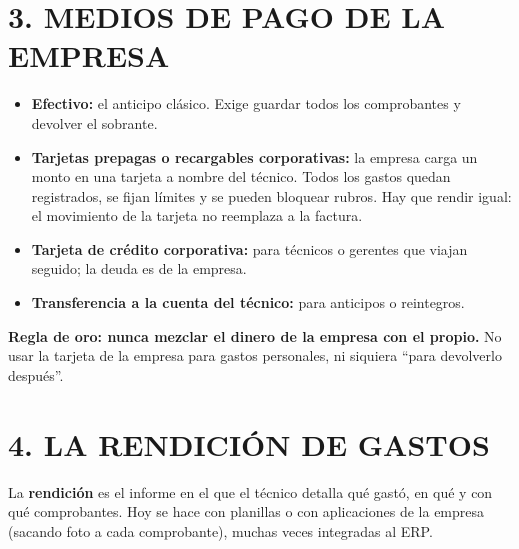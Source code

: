 \section*{3. MEDIOS DE PAGO DE LA EMPRESA}

\begin{itemize}
  \item \textbf{Efectivo:} el anticipo clásico. Exige guardar todos los comprobantes y devolver
        el sobrante.
  \item \textbf{Tarjetas prepagas o recargables corporativas:} la empresa carga un monto en
        una tarjeta a nombre del técnico. Todos los gastos quedan registrados, se fijan
        límites y se pueden bloquear rubros. Hay que rendir igual: el movimiento de la tarjeta
        no reemplaza a la factura.
  \item \textbf{Tarjeta de crédito corporativa:} para técnicos o gerentes que viajan seguido;
        la deuda es de la empresa.
  \item \textbf{Transferencia a la cuenta del técnico:} para anticipos o reintegros.
\end{itemize}
\textbf{Regla de oro: nunca mezclar el dinero de la empresa con el propio.} No usar la tarjeta
de la empresa para gastos personales, ni siquiera ``para devolverlo después''.

\section*{4. LA RENDICIÓN DE GASTOS}

La \textbf{rendición} es el informe en el que el técnico detalla qué gastó, en qué y con qué
comprobantes. Hoy se hace con planillas o con aplicaciones de la empresa (sacando foto a cada
comprobante), muchas veces integradas al ERP.

